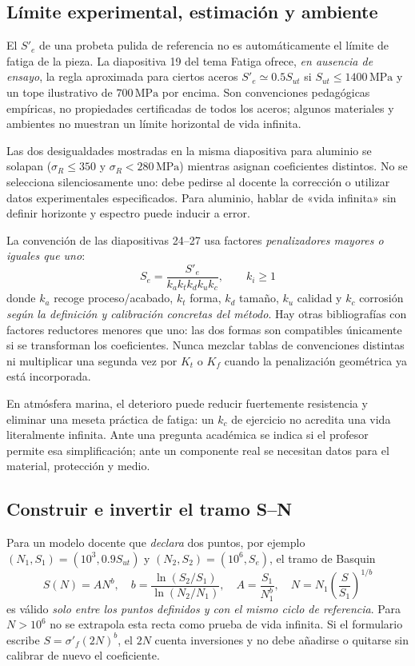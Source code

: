 \subsection{Límite experimental, estimación y ambiente}
El $S'_e$ de una probeta pulida de referencia no es automáticamente el límite de fatiga de la pieza. La diapositiva 19 del tema Fatiga ofrece, \emph{en ausencia de ensayo}, la regla aproximada para ciertos aceros $S'_e\simeq0.5S_{ut}$ si $S_{ut}\leq1400\,\mathrm{MPa}$ y un tope ilustrativo de $700\,\mathrm{MPa}$ por encima. Son convenciones pedagógicas empíricas, no propiedades certificadas de todos los aceros; algunos materiales y ambientes no muestran un límite horizontal de vida infinita.

Las dos desigualdades mostradas en la misma diapositiva para aluminio se solapan ($\sigma_R\leq350$ y $\sigma_R<280\,\mathrm{MPa}$) mientras asignan coeficientes distintos. No se selecciona silenciosamente uno: debe pedirse al docente la corrección o utilizar datos experimentales especificados. Para aluminio, hablar de «vida infinita» sin definir horizonte y espectro puede inducir a error.

La convención de las diapositivas 24--27 usa factores \emph{penalizadores mayores o iguales que uno}:
\begin{equation}
S_e=\frac{S'_e}{k_a k_t k_d k_u k_c},\qquad k_i\geq1
\label{eq:puente-se}
\end{equation}
donde $k_a$ recoge proceso/acabado, $k_t$ forma, $k_d$ tamaño, $k_u$ calidad y $k_c$ corrosión \emph{según la definición y calibración concretas del método}. Hay otras bibliografías con factores reductores menores que uno: las dos formas son compatibles únicamente si se transforman los coeficientes. Nunca mezclar tablas de convenciones distintas ni multiplicar una segunda vez por $K_t$ o $K_f$ cuando la penalización geométrica ya está incorporada.

En atmósfera marina, el deterioro puede reducir fuertemente resistencia y eliminar una meseta práctica de fatiga: un $k_c$ de ejercicio no acredita una vida literalmente infinita. Ante una pregunta académica se indica si el profesor permite esa simplificación; ante un componente real se necesitan datos para el material, protección y medio.

\subsection{Construir e invertir el tramo S--N}
Para un modelo docente que \emph{declara} dos puntos, por ejemplo $(N_1,S_1)=(10^3,0.9S_{ut})$ y $(N_2,S_2)=(10^6,S_e)$, el tramo de Basquin
\[
S(N)=A N^b,\quad
b=\frac{\ln(S_2/S_1)}{\ln(N_2/N_1)},\quad
A=\frac{S_1}{N_1^b},\quad
N=N_1\left(\frac{S}{S_1}\right)^{1/b}
\]
es válido \emph{solo entre los puntos definidos y con el mismo ciclo de referencia}. Para $N>10^6$ no se extrapola esta recta como prueba de vida infinita. Si el formulario escribe $S=\sigma'_f(2N)^b$, el $2N$ cuenta inversiones y no debe añadirse o quitarse sin calibrar de nuevo el coeficiente.


